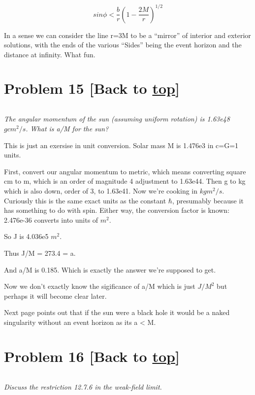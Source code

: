 \documentclass[landscape,letterpaper,10pt,english]{article}
\begin{document}
\[ sin\phi < \frac{b}{r} \left( 1-\frac{2M}{r} \right)^{1/2} \]

In a sense we can consider the line r=3M to be a ``mirror'' of interior
and exterior solutions, with the ends of the various ``Sides'' being the
event horizon and the distance at infinity. What fun.

    \hypertarget{problem-15-back-to-top}{%
\section{\texorpdfstring{Problem 15 {[}Back to
\hyperref[toc]{top}{]}}{Problem 15 {[}Back to {]}}}\label{problem-15-back-to-top}}

\[\label{P15}\]

\emph{The angular momentum of the sun (assuming uniform rotation) is
1.63e48 \(g cm^2 / s\). What is a/M for the sun?}

This is just an exersise in unit conversion. Solar mass M is 1.476e3 in
c=G=1 units.

First, convert our angular momentum to metric, which means converting
square cm to m, which is an order of magnitude 4 adjustment to 1.63e44.
Then g to kg which is also down, order of 3, to 1.63e41. Now we're
cooking in \(kg m^2 / s\). Curiously this is the same exact units as the
constant \(\hbar\), presumably because it has something to do with spin.
Either way, the conversion factor is known: 2.476e-36 converts into
units of \(m^2.\)

So J is 4.036e5 \(m^2\).

Thus J/M = 273.4 = a.

And a/M is 0.185. Which is exactly the answer we're supposed to get.

Now we don't exactly know the sigificance of a/M which is just \(J/M^2\)
but perhaps it will become clear later.

Next page points out that if the sun were a black hole it would be a
naked singularity without an event horizon as its a \textless{} M.

    \hypertarget{problem-16-back-to-top}{%
\section{\texorpdfstring{Problem 16 {[}Back to
\hyperref[toc]{top}{]}}{Problem 16 {[}Back to {]}}}\label{problem-16-back-to-top}}

\[\label{P16}\]

\emph{Discuss the restriction 12.7.6 in the weak-field limit.}
\end{document}
